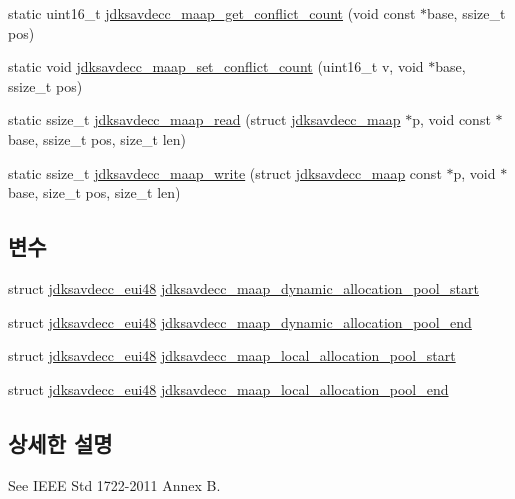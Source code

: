 \begin{DoxyCompactItemize}
\item 
static uint16\+\_\+t \hyperlink{group__maap_ga5ee187eaa19bfb46348ecb21ed2445a6}{jdksavdecc\+\_\+maap\+\_\+get\+\_\+conflict\+\_\+count} (void const $\ast$base, ssize\+\_\+t pos)
\item 
static void \hyperlink{group__maap_gac0e57e547d918d3576e7b9ed184e6ece}{jdksavdecc\+\_\+maap\+\_\+set\+\_\+conflict\+\_\+count} (uint16\+\_\+t v, void $\ast$base, ssize\+\_\+t pos)
\item 
static ssize\+\_\+t \hyperlink{group__maap_ga6d3101b71cf397abb634bf28e78f1522}{jdksavdecc\+\_\+maap\+\_\+read} (struct \hyperlink{structjdksavdecc__maap}{jdksavdecc\+\_\+maap} $\ast$p, void const $\ast$base, ssize\+\_\+t pos, size\+\_\+t len)
\item 
static ssize\+\_\+t \hyperlink{group__maap_ga53b823e33af6d26d36a3e91be92e7c91}{jdksavdecc\+\_\+maap\+\_\+write} (struct \hyperlink{structjdksavdecc__maap}{jdksavdecc\+\_\+maap} const $\ast$p, void $\ast$base, size\+\_\+t pos, size\+\_\+t len)
\end{DoxyCompactItemize}
\subsection*{변수}
\begin{DoxyCompactItemize}
\item 
struct \hyperlink{structjdksavdecc__eui48}{jdksavdecc\+\_\+eui48} \hyperlink{group__maap_ga0b0791ba795b6f2f27b392ec448d5b1f}{jdksavdecc\+\_\+maap\+\_\+dynamic\+\_\+allocation\+\_\+pool\+\_\+start}
\item 
struct \hyperlink{structjdksavdecc__eui48}{jdksavdecc\+\_\+eui48} \hyperlink{group__maap_ga0233a9c2fef3818db040ab70e050d2d8}{jdksavdecc\+\_\+maap\+\_\+dynamic\+\_\+allocation\+\_\+pool\+\_\+end}
\item 
struct \hyperlink{structjdksavdecc__eui48}{jdksavdecc\+\_\+eui48} \hyperlink{group__maap_gad50c2a9baf15dd4433e9c95ed696943d}{jdksavdecc\+\_\+maap\+\_\+local\+\_\+allocation\+\_\+pool\+\_\+start}
\item 
struct \hyperlink{structjdksavdecc__eui48}{jdksavdecc\+\_\+eui48} \hyperlink{group__maap_ga613f18192fb8974b3bb889465dfa55f4}{jdksavdecc\+\_\+maap\+\_\+local\+\_\+allocation\+\_\+pool\+\_\+end}
\end{DoxyCompactItemize}


\subsection{상세한 설명}
See I\+E\+EE Std 1722-\/2011 Annex B. 

